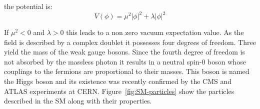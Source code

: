the potential is:
\begin{equation}
\label{eq:higgs-potential}
V(\phi) = \mu^2|\phi|^2 + \lambda|\phi|^2
\end{equation}

If $\mu^2 < 0$ and $\lambda > 0$ this leads to a non zero vacuum expectation value. 
As the field is described by a complex doublet it possesses four degrees of freedom. 
Three yield the mass of the weak gauge bosons. Since the fourth degree of freedom is 
not absorbed by the massless photon it results in a neutral spin-0 boson whose couplings 
to the fermions are proportional to their masses. This boson is named the Higgs boson and
its existence was recently confirmed by the CMS and ATLAS experiments at CERN.
Figure~\ref{fig:SM-particles} show the particles described in the SM along with their properties.

